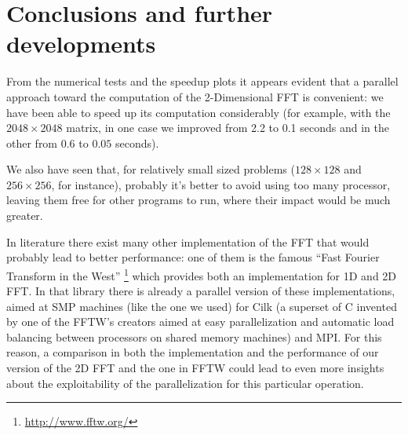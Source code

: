 \documentclass[a4paper,11pt]{article}
\begin{document}
\section{Conclusions and further developments}

From the numerical tests and the speedup plots it appears evident that a parallel approach toward the computation of the 2-Dimensional FFT is convenient: we have been able to speed up its computation considerably (for example, with the $2048 \times 2048$ matrix, in one case we improved from 2.2 to 0.1 seconds and in the other from $0.6$ to $0.05$ seconds).

We also have seen that, for relatively small sized problems ($128 \times 128$ and $256 \times 256$, for instance), probably it's better to avoid using too many processor, leaving them free for other programs to run, where their impact would be much greater.

In literature there exist many other implementation of the FFT that would probably lead to better performance: one of them is the famous ``Fast Fourier Transform in the West'' \footnote{\url{http://www.fftw.org/}} which provides both an implementation for  1D and 2D FFT. In that library there is already a parallel version of these implementations, aimed at SMP machines (like the one we used) for Cilk (a superset of C invented by one of the FFTW's creators aimed at easy parallelization and automatic load balancing between processors on shared memory machines) and MPI. For this reason, a comparison in both the implementation and the performance of our version of the 2D FFT and the one in FFTW could lead to even more insights about the exploitability of the parallelization for this particular operation.

\printbibliography
\end{document}
